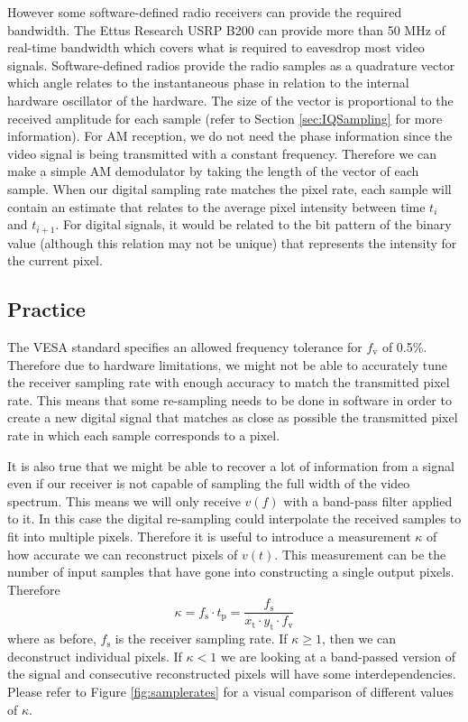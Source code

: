 \documentclass[a4paper,12pt,twoside,openright]{report}
\begin{document}
However some software-defined radio receivers can provide the required bandwidth. The Ettus Research USRP B200 can provide more than 50 MHz of real-time bandwidth which covers what is required to eavesdrop most video signals. Software-defined radios provide the radio samples as a quadrature vector which angle relates to the instantaneous phase in relation to the internal hardware oscillator of the hardware. The size of the vector is proportional to the received amplitude for each sample (refer to Section \ref{sec:IQSampling} for more information). For AM reception, we do not need the phase information since the video signal is being transmitted with a constant frequency. Therefore we can make a simple AM demodulator by taking the length of the vector of each sample. When our digital sampling rate matches the pixel rate, each sample will contain an estimate that relates to the average pixel intensity between time $t_{i}$ and $t_{i+1}$. For digital signals, it would be related to the bit pattern of the binary value (although this relation may not be unique) that represents the intensity for the current pixel.

\subsection{Practice}
The VESA standard specifies an allowed frequency tolerance for $f_\text{v}$ of 0.5\%. Therefore due to hardware limitations, we might not be able to accurately tune the receiver sampling rate with enough accuracy to match the transmitted pixel rate. This means that some re-sampling needs to be done in software in order to create a new digital signal that matches as close as possible the transmitted pixel rate in which each sample corresponds to a pixel.

It is also true that we might be able to recover a lot of information from a signal even if our receiver is not capable of sampling the full width of the video spectrum. This means we will only receive $v(f)$ with a band-pass filter applied to it. In this case the digital re-sampling could interpolate the received samples to fit into multiple pixels. Therefore it is useful to introduce a measurement $\kappa$ of how accurate we can reconstruct pixels of $v(t)$. This measurement can be the number of input samples that have gone into constructing a single output pixels. Therefore
\begin{equation}
\label{eq:kappa}
\kappa = f_\text{s} \cdot t_\text{p} = \frac{f_\text{s}}{x_\text{t} \cdot y_\text{t} \cdot f_\text{v}}
\end{equation}
where as before, $f_\text{s}$ is the receiver sampling rate. If $\kappa \geq 1$, then we can deconstruct individual pixels. If $\kappa < 1$ we are looking at a band-passed version of the signal and consecutive reconstructed pixels will have some interdependencies. Please refer to Figure \ref{fig:samplerates} for a visual comparison of different values of $\kappa$.
\end{document}
